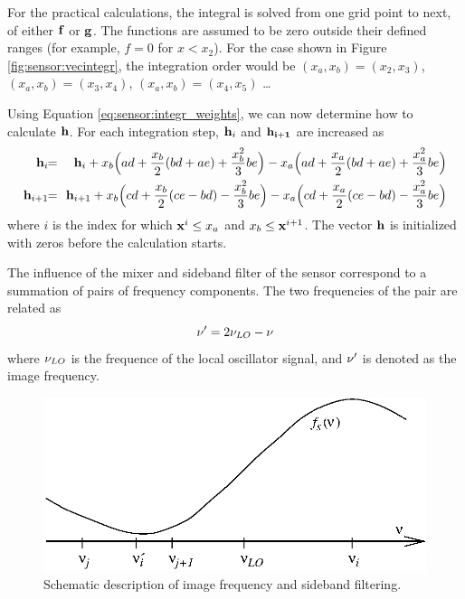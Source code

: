  For the practical calculations, the integral is solved from one grid
 point to next, of either $\mathbf{f}$ or $\mathbf{g}$. The functions are 
 assumed to be zero outside their defined ranges (for example, $f=0$ 
 for $x<x_2$).
 For the case
 shown in Figure \ref{fig:sensor:vecintegr}, the integration order would be
 $(x_a,x_b)=(x_2,x_3)$, $(x_a,x_b)=(x_3,x_4)$, $(x_a,x_b)=(x_4,x_5)$
 \ldots\
  
 Using Equation \ref{eq:sensor:integr_weights}, we can now determine how to
 calculate $\mathbf{h}$. For each integration step, $\mathbf{h}_i$ and
 $\mathbf{h_{i+1}}$ are increased as
 \begin{eqnarray}
    \mat{h}_i \!\! &=& \!\! \mat{h}_i +    
              x_b\Big(ad+\frac{x_b}{2}(bd+ae)+\frac{x_b^2}{3}be\Big) - 
              x_a\Big(ad+\frac{x_a}{2}(bd+ae)+\frac{x_a^2}{3}be\Big) 
    \nonumber \\
    \mat{h}_{i+1} \!\! &=& \!\! \mat{h}_{i+1} +
              x_b\Big(cd+\frac{x_b}{2}(ce-bd)-\frac{x_b^2}{3}be\Big) - 
              x_a\Big(cd+\frac{x_a}{2}(ce-bd)-\frac{x_a^2}{3}be\Big) 
    \nonumber
 \end{eqnarray}
 where $i$ is the index for which $\mathbf{x}^i \leq x_a$ and $x_b \leq
 \mathbf{x}^{i+1}$. The vector $\mathbf{h}$ is initialized with
 zeros before the calculation starts.



  
 The influence of the mixer and sideband filter of the sensor
 correspond to a summation of pairs of frequency components. The two
 frequencies of the pair are related as
 \begin{equation}
    \nu' = 2\nu_{LO}-\nu
 \end{equation}
 where $\nu_{LO}$ is the frequence of the local oscillator signal, and
 $\nu'$ is denoted as the image frequency.

 \begin{figure}[tb]
  \begin{center}
    \includegraphics*[width=0.8\hsize]{Figs/sideband.eps}
    \caption{Schematic description of image frequency and sideband filtering.}
   \label{fig:sensor:sideband} 
  \end{center} 
 \end{figure}
 
